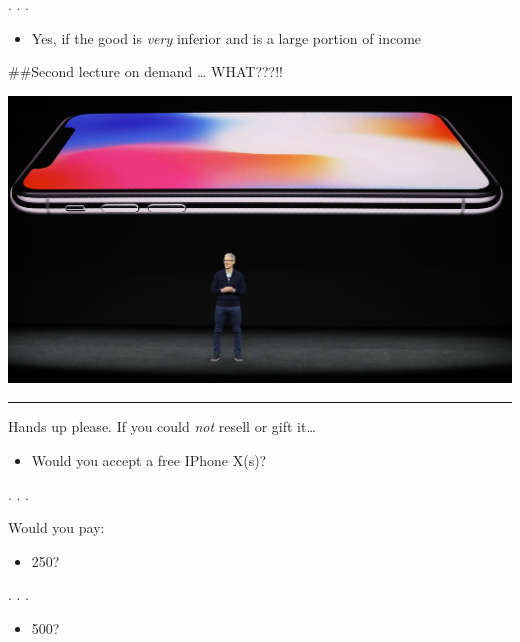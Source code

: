 \documentclass[]{article}
\providecommand{\tightlist}{%
  \setlength{\itemsep}{0pt}\setlength{\parskip}{0pt}}
\begin{document}
. . .

\begin{itemize}
\tightlist
\item
  Yes, if the good is \emph{very} inferior and is a large portion of
  income
\end{itemize}


\#\#Second lecture on demand \ldots{} WHAT???!!

\includegraphics[height=3in]{picsfigs/iphonex.jpg}

\begin{center}\rule{0.5\linewidth}{\linethickness}\end{center}

Hands up please. If you could \emph{not} resell or gift it\ldots{}

\begin{itemize}
\tightlist
\item
  Would you accept a free IPhone X(s)?
\end{itemize}

. . .

Would you pay:

\begin{itemize}
\tightlist
\item
  250?
\end{itemize}

. . .

\begin{itemize}
\tightlist
\item
  500?
\end{itemize}
\end{document}
